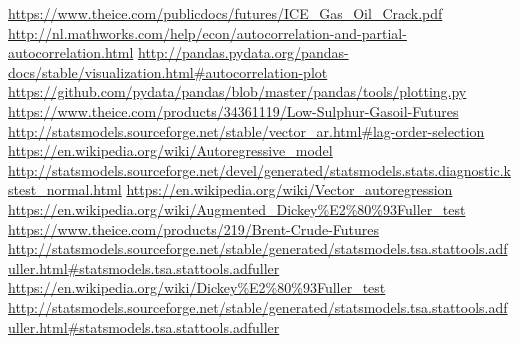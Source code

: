 \documentclass[11pt]{article}
\begin{document}
    \begin{thebibliography}{1}
 \href{https://www.theice.com/publicdocs/futures/ICE\_Gas\_Oil\_Crack.pdf}{https://www.theice.com/publicdocs/futures/ICE\_Gas\_Oil\_Crack.pdf}
 \href{http://nl.mathworks.com/help/econ/autocorrelation-and-partial-autocorrelation.html}{http://nl.mathworks.com/help/econ/autocorrelation-and-partial-autocorrelation.html}
 \href{http://pandas.pydata.org/pandas-docs/stable/visualization.html\#autocorrelation-plot}{http://pandas.pydata.org/pandas-docs/stable/visualization.html\#autocorrelation-plot}
 \href{https://github.com/pydata/pandas/blob/master/pandas/tools/plotting.py}{https://github.com/pydata/pandas/blob/master/pandas/tools/plotting.py}
 \href{https://www.theice.com/products/34361119/Low-Sulphur-Gasoil-Futures}{https://www.theice.com/products/34361119/Low-Sulphur-Gasoil-Futures}
 \href{http://statsmodels.sourceforge.net/stable/vector\_ar.html\#lag-order-selection}{http://statsmodels.sourceforge.net/stable/vector\_ar.html\#lag-order-selection}
 \href{https://en.wikipedia.org/wiki/Autoregressive\_model}{https://en.wikipedia.org/wiki/Autoregressive\_model}
 \href{http://statsmodels.sourceforge.net/devel/generated/statsmodels.stats.diagnostic.kstest\_normal.html}{http://statsmodels.sourceforge.net/devel/generated/statsmodels.stats.diagnostic.kstest\_normal.html}
 \href{https://en.wikipedia.org/wiki/Vector\_autoregression}{https://en.wikipedia.org/wiki/Vector\_autoregression}
 \href{https://en.wikipedia.org/wiki/Augmented\_Dickey\%E2\%80\%93Fuller\_test}{https://en.wikipedia.org/wiki/Augmented\_Dickey\%E2\%80\%93Fuller\_test}
 \href{}{}
 \href{https://www.theice.com/products/219/Brent-Crude-Futures}{https://www.theice.com/products/219/Brent-Crude-Futures}
 \href{http://statsmodels.sourceforge.net/stable/generated/statsmodels.tsa.stattools.adfuller.html\#statsmodels.tsa.stattools.adfuller}{http://statsmodels.sourceforge.net/stable/generated/statsmodels.tsa.stattools.adfuller.html\#statsmodels.tsa.stattools.adfuller}
 \href{https://en.wikipedia.org/wiki/Dickey\%E2\%80\%93Fuller\_test}{https://en.wikipedia.org/wiki/Dickey\%E2\%80\%93Fuller\_test}
 \href{http://statsmodels.sourceforge.net/stable/generated/statsmodels.tsa.stattools.adfuller.html\#statsmodels.tsa.stattools.adfuller}{http://statsmodels.sourceforge.net/stable/generated/statsmodels.tsa.stattools.adfuller.html\#statsmodels.tsa.stattools.adfuller}

\end{thebibliography}
\end{document}

